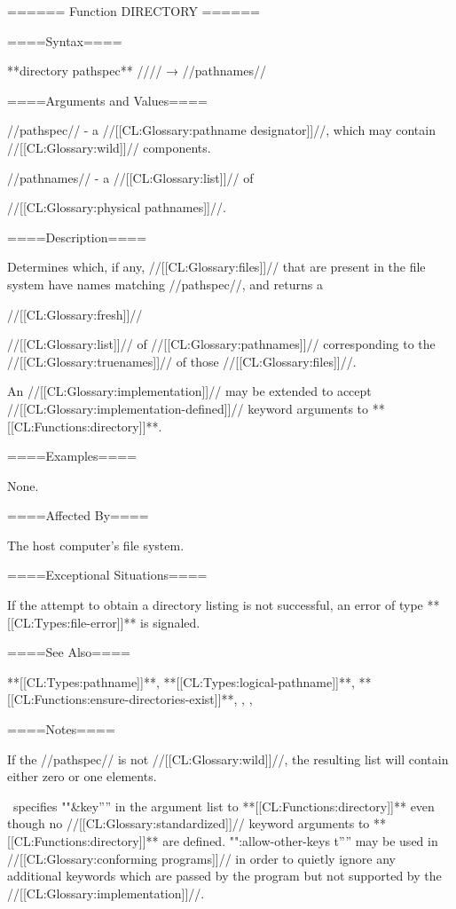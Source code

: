 ====== Function DIRECTORY ======

====Syntax====

**directory {pathspec** //\key}// → //pathnames//

====Arguments and Values====

//pathspec// - a //[[CL:Glossary:pathname designator]]//, which may contain //[[CL:Glossary:wild]]// components.

//pathnames// - a //[[CL:Glossary:list]]// of

//[[CL:Glossary:physical pathnames]]//.

====Description====

Determines which, if any, //[[CL:Glossary:files]]// that are present in the file system have names matching //pathspec//, and returns a

//[[CL:Glossary:fresh]]//

//[[CL:Glossary:list]]// of //[[CL:Glossary:pathnames]]// corresponding to the //[[CL:Glossary:truenames]]// of those //[[CL:Glossary:files]]//.

An //[[CL:Glossary:implementation]]// may be extended to accept //[[CL:Glossary:implementation-defined]]// keyword arguments to **[[CL:Functions:directory]]**.

====Examples====

None.

====Affected By====

The host computer's file system.

====Exceptional Situations====

If the attempt to obtain a directory listing is not successful, an error of type **[[CL:Types:file-error]]** is signaled.

====See Also====

**[[CL:Types:pathname]]**, **[[CL:Types:logical-pathname]]**, **[[CL:Functions:ensure-directories-exist]]**, {\secref\FileSystemConcepts}, {\secref\OpenAndClosedStreams},

{\secref\PathnamesAsFilenames}

====Notes====

If the //pathspec// is not //[[CL:Glossary:wild]]//, the resulting list will contain either zero or one elements.

\clisp\ specifies ""&key'''' in the argument list to **[[CL:Functions:directory]]** even though no //[[CL:Glossary:standardized]]// keyword arguments to **[[CL:Functions:directory]]** are defined. "":allow-other-keys t'''' may be used in //[[CL:Glossary:conforming programs]]// in order to quietly ignore any additional keywords which are passed by the program but not supported by the //[[CL:Glossary:implementation]]//.

     

